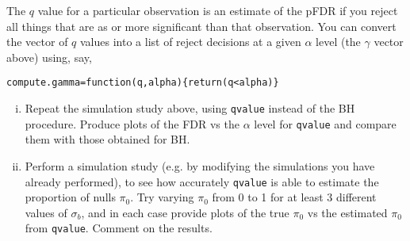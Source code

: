 \documentclass[12pt]{article}
\begin{document}
\begin{enumerate}
The $q$ value for a particular observation is an estimate of the pFDR 
if you reject all things that are as or more significant than that observation.
You can convert the vector of $q$ values into a list of reject decisions at a given $\alpha$ level (the $\gamma$ vector above) 
using, say,
\begin{verbatim}
compute.gamma=function(q,alpha){return(q<alpha)}
\end{verbatim}

\begin{enumerate}[i)]
\item Repeat the simulation study above, using {\tt qvalue} instead of the BH procedure. Produce plots of the FDR vs the $\alpha$
level for {\tt qvalue} and compare them with those obtained for BH.
\item Perform a simulation study (e.g. by modifying the simulations you have already performed), to see how accurately {\tt qvalue} is able to estimate the
proportion of nulls $\pi_0$. Try varying  $\pi_0$ from 0 to 1 for at least 3 different values of $\sigma_b$, and in each case provide plots of the true $\pi_0$ vs
the estimated $\pi_0$ from {\tt qvalue}. Comment on the results.
\end{enumerate}



\end{enumerate}
\end{document}
